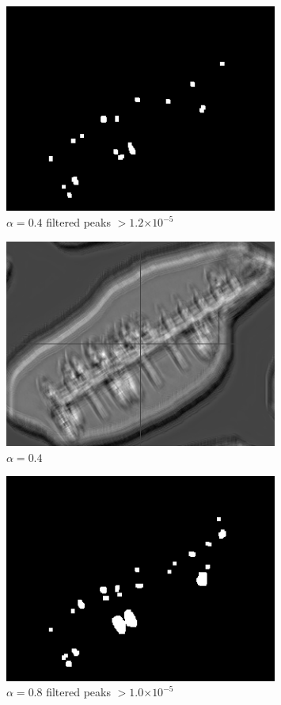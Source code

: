 \documentclass[12pt]{article}
\providecommand{\e}[1]{\ensuremath{\times 10^{#1}}}
\begin{document}
\begin{figure}
\centering
\includegraphics[width=0.80\textwidth]{v2/boats_a04_peak.png}
\caption{\(\alpha=0.4\) filtered peaks \(> 1.2\e{-5}\)}
\label{a04peak}
\end{figure}

\begin{figure}
\centering
\includegraphics[width=0.80\textwidth]{v2/boats_a04.png}
\caption{\(\alpha=0.4\)}
\label{a04}
\end{figure}

\begin{figure}
\centering
\includegraphics[width=0.80\textwidth]{v2/boats_a08_peak.png}
\caption{\(\alpha=0.8\) filtered peaks \(> 1.0\e{-5}\)}
\label{a08peak}
\end{figure}
\end{document}
